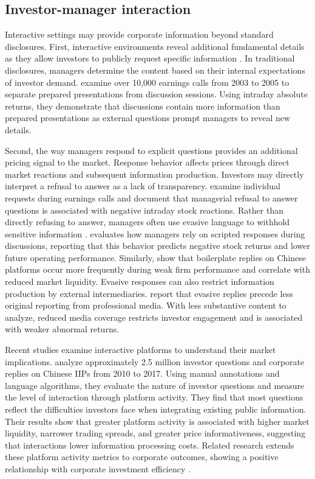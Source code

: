 \subsection{Investor-manager interaction}

Interactive settings may provide corporate information beyond standard disclosures. First, interactive environments reveal additional fundamental details as they allow investors to publicly request specific information \citep{hollander2010}. In traditional disclosures, managers determine the content based on their internal expectations of investor demand. \citet{matsumoto2011} examine over 10,000 earnings calls from 2003 to 2005 to separate prepared presentations from discussion sessions. Using intraday absolute returns, they demonstrate that discussions contain more information than prepared presentations as external questions prompt managers to reveal new details.

Second, the way managers respond to explicit questions provides an additional pricing signal to the market. Response behavior affects prices through direct market reactions and subsequent information production. Investors may directly interpret a refusal to answer as a lack of transparency. \citet{hollander2010} examine individual requests during earnings calls and document that managerial refusal to answer questions is associated with negative intraday stock reactions. Rather than directly refusing to answer, managers often use evasive language to withhold sensitive information \citep{gow2021}. \citet{lee2016} evaluates how managers rely on scripted responses during discussions, reporting that this behavior predicts negative stock returns and lower future operating performance. Similarly, \citet{xie2023} show that boilerplate replies on Chinese platforms occur more frequently during weak firm performance and correlate with reduced market liquidity. Evasive responses can also restrict information production by external intermediaries. \citet{boustanifar2025} report that evasive replies precede less original reporting from professional media. With less substantive content to analyze, reduced media coverage restricts investor engagement and is associated with weaker abnormal returns.


Recent studies examine interactive platforms to understand their market implications. \citet{lee2022shall} analyze approximately 2.5 million investor questions and corporate replies on Chinese IIPs from 2010 to 2017. Using manual annotations and language algorithms, they evaluate the nature of investor questions and measure the level of interaction through platform activity. They find that most questions reflect the difficulties investors face when integrating existing public information. Their results show that greater platform activity is associated with higher market liquidity, narrower trading spreads, and greater price informativeness, suggesting that interactions lower information processing costs. Related research extends these platform activity metrics to corporate outcomes, showing a positive relationship with corporate investment efficiency \citep{xu2024}. 

